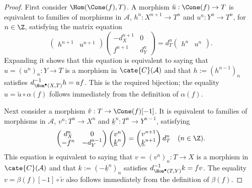 \begin{proof}
	First consider $\Hom(\Cone(f),T)$. A morphism
	$\tilde{u}:\Cone(f)\to T$ is equivalent to families of morphisms in
	$\mathcal{A}$, $h^n:X^{n+1}\to T^n$ and $u^n:Y^n\to T^n$, for
	$n\in\Z$, satisfying the matrix equation
	\[\begin{pmatrix}
		h^{n+1} & u^{n+1}
	\end{pmatrix} \begin{pmatrix}
		-d_X^{n+1} & 0 \\
		f^{n+1} & d_Y^n
	\end{pmatrix} = d_T^n \begin{pmatrix}
		h^n & u^n
	\end{pmatrix}. \]
	Expanding it shows that this equation is equivalent to saying that
	$u=(u^n)_n:Y\to T$ is a morphism in $\cate{C}(\mathcal{A})$ and that
	$h:=(h^{n-1})_n$ satisfies
	$d_{\Hom^\bullet(X,T)}^{-1}h=uf$. This is the required bijection; the
	equality $u=\tilde{u}\circ\alpha(f)$ follows immediately from the
	definition of $\alpha(f)$.

	Next consider a morphism $\tilde{v}:T\to\Cone(f)[-1]$. It is equivalent
	to families of morphisms in $\mathcal{A}$, $v^n:T^n\to X^n$ and
	$\underline{k}^n:T^n\to Y^{n-1}$, satisfying
	\[\begin{pmatrix}
		d_X^n & 0 \\
		-f^n & -d_Y^{n-1}
	\end{pmatrix} \begin{pmatrix}
		v^n \\ \underline{k}^n
	\end{pmatrix} = \begin{pmatrix}
		v^{n+1} \\ \underline{k}^{n+1}
	\end{pmatrix} d_T^n
	\quad (n \in \Z). \]
	This equation is equivalent to saying that $v=(v^n)_n:T\to X$ is a
	morphism in $\cate{C}(\mathcal{A})$ and that
	$k:=(-\underline{k}^n)_n$ satisfies
	$d_{\Hom^\bullet(T,Y)}^{-1}k=fv$. The equality
	$v=\beta(f)[-1]\circ\tilde{v}$ also follows immediately from the
	definition of $\beta(f)$.
\end{proof}


